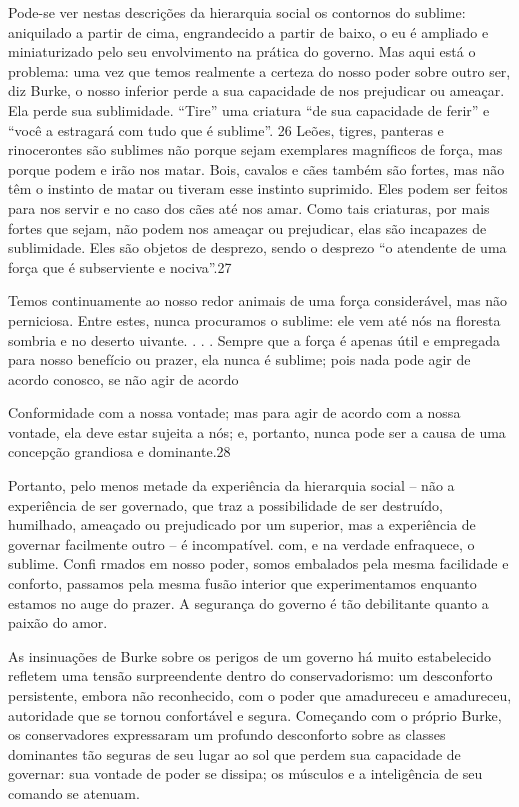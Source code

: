  \par 
Pode-se ver nestas descrições da hierarquia social os contornos do sublime: aniquilado a partir de cima, engrandecido a partir de baixo, o eu é ampliado e miniaturizado pelo seu envolvimento na prática do governo. Mas aqui está o problema: uma vez que temos realmente a certeza do nosso poder sobre outro ser, diz Burke, o nosso inferior perde a sua capacidade de nos prejudicar ou ameaçar. Ela perde sua sublimidade. “Tire” uma criatura “de sua capacidade de ferir” e “você a estragará com tudo que é sublime”. {\color{blue}26} Leões, tigres, panteras e rinocerontes são sublimes não porque sejam exemplares magníficos de força, mas porque podem e irão nos matar. Bois, cavalos e cães também são fortes, mas não têm o instinto de matar ou tiveram esse instinto suprimido. Eles podem ser feitos para nos servir e no caso dos cães até nos amar. Como tais criaturas, por mais fortes que sejam, não podem nos ameaçar ou prejudicar, elas são incapazes de sublimidade. Eles são objetos de desprezo, sendo o desprezo “o atendente de uma força que é subserviente e nociva”.{\color{blue}27}
 \par 
Temos continuamente ao nosso redor animais de uma força considerável, mas não perniciosa. Entre estes, nunca procuramos o sublime: ele vem até nós na floresta sombria e no deserto uivante. . . . Sempre que a força é apenas útil e empregada para nosso benefício ou prazer, ela nunca é sublime; pois nada pode agir de acordo conosco, se não agir de acordo
 \par 
Conformidade com a nossa vontade; mas para agir de acordo com a nossa vontade, ela deve estar sujeita a nós; e, portanto, nunca pode ser a causa de uma concepção grandiosa e dominante.{\color{blue}28}
 \par 
Portanto, pelo menos metade da experiência da hierarquia social – não a experiência de ser governado, que traz a possibilidade de ser destruído, humilhado, ameaçado ou prejudicado por um superior, mas a experiência de governar facilmente outro – é incompatível. com, e na verdade enfraquece, o sublime. Confi rmados em nosso poder, somos embalados pela mesma facilidade e conforto, passamos pela mesma fusão interior que experimentamos enquanto estamos no auge do prazer. A segurança do governo é tão debilitante quanto a paixão do amor.
 \par 
As insinuações de Burke sobre os perigos de um governo há muito estabelecido refletem uma tensão surpreendente dentro do conservadorismo: um desconforto persistente, embora não reconhecido, com o poder que amadureceu e amadureceu, autoridade que se tornou confortável e segura. Começando com o próprio Burke, os conservadores expressaram um profundo desconforto sobre as classes dominantes tão seguras de seu lugar ao sol que perdem sua capacidade de governar: sua vontade de poder se dissipa; os músculos e a inteligência de seu comando se atenuam.
